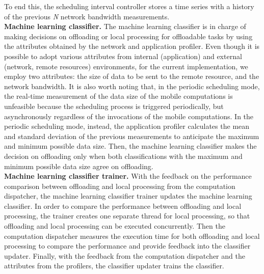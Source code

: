 \documentclass[10pt, conference, compsocconf]{IEEEtran}
\begin{document}
{%
To end this, the scheduling interval controller stores a time series with a history of the previous
\textit{N} network bandwidth measurements.\\
%
\textbf{Machine learning classifier.} The machine learning classifier is
in charge of making decisions on offloading or local processing for
offloadable tasks by using the attributes obtained by
the network and application profiler.
%
Even though it is possible to adopt various attributes
from internal (application) and external (network, remote resources) environments, for
the current implementation, we employ two attributes: the size of data
to be sent to the remote resource, and the network bandwidth.
%
It is also worth noting that, in the periodic scheduling mode, the
real-time measurement of the data size of the mobile computations is
unfeasible because the scheduling process is triggered periodically, but
asynchronously regardless of the invocations of the mobile computations.
In the periodic scheduling mode, instead, the application profiler
calculates the mean and standard deviation of the previous measurements
to anticipate the maximum and minimum possible data size.
Then, the machine learning classifier makes the decision on offloading
only when both classifications with the maximum and minimum possible
data size agree on offloading.\\
%
\textbf{Machine learning classifier trainer.} With the feedback on the
performance comparison between offloading and local processing from the
computation dispatcher, the machine learning classifier trainer updates
the machine learning classifier.
%
In order to compare the performance between offloading and local
processing, the trainer creates one separate thread for local
processing, so that offloading and local processing can be executed
concurrently.
%
Then the computation dispatcher measures the execution time for both
offloading and local processing to compare the performance and provide
feedback into the classifier updater.
%
Finally, with the feedback from the computation dispatcher and the
attributes from the profilers, the classifier updater trains the
classifier.
}
\end{document}
